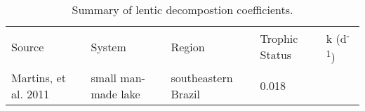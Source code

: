 \begin{table}
\label{tab:k_summary}
\begin{tabular}{l l l l l}
Source & System & Region & Trophic Status & k (d\textsuperscript{-1}) \\
Martins, et al. 2011 & small man-made lake & southeastern Brazil & 0.018 \\



\end{tabular}
\caption{Summary of lentic decompostion coefficients.}
\end{table}